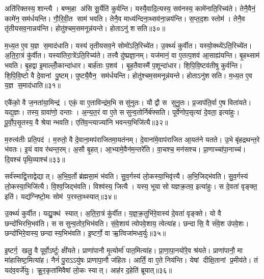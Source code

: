 अति॑रिक्तस्य॒ शान्त्यै। बण्म॒हा अ॑सि सू॒र्येति॑ कुर्वन्ति। यस्यै॒वादि॒त्यस्य॒ सव॑नस्य॒ कामे॑नाति॒रिच्य॑ते। तेनै॒वैनं॒ कामे॑न॒ सम॑र्धयन्ति। गौ॒रि॒वी॒त साम॑ भवति। तेनै॒व माध्य॑न्दिना॒थ्सव॑ना॒न्नय॑न्ति। स॒प्त॒द॒शः स्तोम॑। तेनै॒व तृ॑तीयसव॒नान्नय॑न्ति। होतु॑श्चम॒समनून्न॑यन्ते। होताऽनु॑ शसति॥३०॥

म॒ध्य॒त ए॒व य॒ज्ञ स॒माद॑धाति। यस्य॑ तृतीयसव॒ने सोमो॑ऽति॒रिच्ये॑त। उ॒क्थ्यं॑ कुर्वीत। यस्यो॒क्थ्ये॑ऽति॒रिच्ये॑त। अ॒ति॒रा॒त्रं कु॑र्वीत। यस्या॑तिरा॒त्रे॑ऽति॒रिच्य॑ते। तत्त्वै दु॑ष्प्रज्ञा॒नम्। यज॑मानं॒ वा ए॒तत्प॒शव॑ आ॒साह्य॑यन्ति। बृ॒हथ्साम॑ भवति। बृ॒हद्वा इ॒माल्लोँ॒कान्दा॑धार। बार्\mbox{}ह॑ताः प॒शव॑। बृ॒ह॒तैवास्मै॑ प॒शून्दा॑धार। शि॒पि॒वि॒ष्टव॑तीषु कुर्वन्ति। शि॒पि॒वि॒ष्टो वै दे॒वानां पु॒ष्टम्। पुष्ट्यै॒वैन॒ सम॑र्धयन्ति। होतु॑श्चम॒समनून्न॑यन्ते। होताऽनु॑शसति। म॒ध्य॒त ए॒व य॒ज्ञ स॒माद॑धाति॥३१॥\anuvakamend[य॒न्ति॒ सव॑नस्याति॒रिच्य॑ते शसति दाधारा॒ष्टौ च॑]

एकै॑को॒ वै ज॒नता॑या॒मिन्द्र॑। एकं॒ वा ए॒ताविन्द्र॑म॒भि ससु॑नुतः। यौ द्वौ स सुनु॒तः। प्र॒जाप॑ति॒र्वा ए॒ष विता॑यते। यद्य॒ज्ञः। तस्य॒ ग्रावा॑णो॒ दन्ताः। अ॒न्य॒त॒रं वा ए॒ते ससुन्व॒तोर्निर्ब॑फ्सति। पूर्वे॑णोप॒सृत्या॑ दे॒वता॒ इत्या॑हुः। पू॒र्वो॒प॒सृ॒तस्य॒ वै श्रेयान्भवति। एति॑व॒न्त्याज्या॑नि भवन्त्य॒भिजि॑त्यै॥३२॥

म॒रुत्व॑तीः प्रति॒पद॑। म॒रुतो॒ वै दे॒वाना॒मप॑राजितमा॒यत॑नम्। दे॒वाना॑मे॒वाप॑राजित आ॒यत॑ने यतते। उ॒भे बृ॑हद्रथन्त॒रे भ॑वतः। इ॒यं वाव र॑थन्त॒रम्। अ॒सौ बृ॒हत्। आ॒भ्यामे॒वैन॑म॒न्तरे॑ति। वा॒चश्च॒ मन॑सश्च। प्रा॒णाच्चा॑पा॒नाच्च॑। दि॒वश्च॑ पृथि॒व्याश्च॑॥३३॥

सर्व॑स्माद्वि॒त्ताद्वेद्यात्। अ॒भि॒व॒र्तो ब्र॑ह्मसा॒मं भ॑वति। सु॒व॒र्गस्य॑ लो॒कस्या॒भिवृ॑त्त्यै। अ॒भि॒जिद्भ॑वति। सु॒व॒र्गस्य॑ लो॒कस्या॒भिजि॑त्यै। वि॒श्व॒जिद्भ॑वति। विश्व॑स्य॒ जित्यै। यस्य॒ भूयासो यज्ञक्र॒तव॒ इत्या॑हुः। स दे॒वता॑ वृङ्क्त॒ इति॑। यद्य॑ग्निष्टो॒मः सोम॑ प॒रस्ता॒थ्स्यात्॥३४॥

उ॒क्थ्यं॑ कुर्वीत। यद्यु॒क्थ॑ स्यात्। अ॒ति॒रा॒त्रं कु॑र्वीत। य॒ज्ञ॒क्र॒तुभि॑रे॒वास्य॑ दे॒वता॑ वृङ्क्ते। यो वै छन्दो॑भिरभि॒भव॑ति। स ससुन्व॒तोर॒भिभ॑वति। सं॒वे॒शाय॑ त्वोपवे॒शाय॒ त्वेत्या॑ह। छन्दासि॒ वै सं॑वे॒श उ॑पवे॒शः। छन्दो॑भिरे॒वास्य॒ छन्दास्य॒भिभ॑वति। इ॒ष्टर्गो॒ वा ऋ॒त्विजा॑मध्व॒र्युः॥३५॥

इ॒ष्टर्ग॒ खलु॒ वै पूर्वो॒ऽर्ष्टुः क्षी॑यते। प्राणा॑पानौ मृ॒त्योर्मा॑ पात॒मित्या॑ह। प्रा॒णा॒पा॒नयो॑रे॒व श्र॑यते। प्राणा॑पानौ॒ मा मा॑हासिष्ट॒मित्या॑ह। नैनं॑ पु॒राऽऽयु॑षः प्राणापा॒नौ ज॑हितः। आर्तिं॒ वा ए॒ते निय॑न्ति। येषां दीक्षि॒तानां प्र॒मीय॑ते। तं यद॑व॒वर्जे॑युः। क्रू॒र॒कृता॑मिवैषां लो॒कः स्यात्। आह॑र द॒हेति॑ ब्रूयात्॥३६॥

